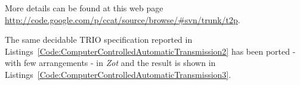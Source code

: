 

More details can be found at this web page \url{http://code.google.com/p/ccat/source/browse/#svn/trunk/t2p}.

The same decidable TRIO specification reported in Listings~\ref{Code:ComputerControlledAutomaticTransmission2} has been ported - with few arrangements - in \emph{Zot} and the result is shown in Listings~\ref{Code:ComputerControlledAutomaticTransmission3}.


